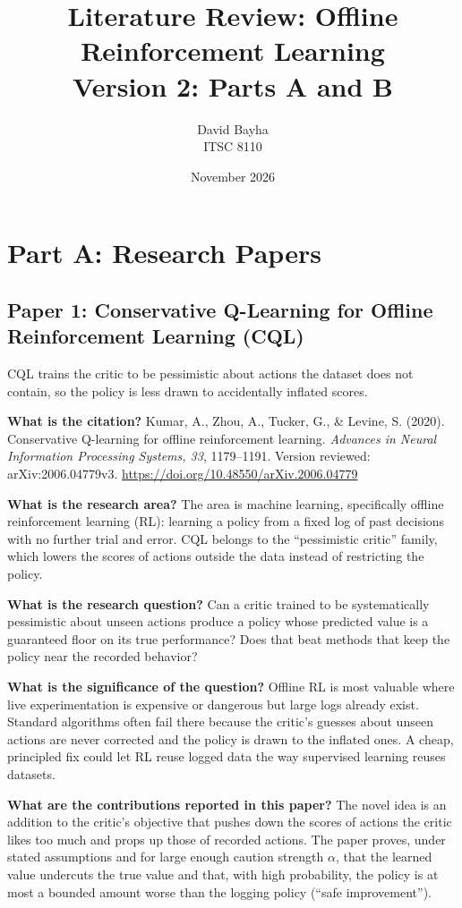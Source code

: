 \documentclass[11pt]{article}
\title{Literature Review: Offline Reinforcement Learning\\Version 2: Parts A and B}
\author{David Bayha\\ITSC 8110}
\date{November 2026}
\newcommand{\paper}[1]{\subsection*{#1}}
\newcommand{\q}[2]{\item \textbf{#1} #2}
\begin{document}
\maketitle



\section*{Part A: Research Papers}



\paper{Paper 1: Conservative Q-Learning for Offline Reinforcement Learning (CQL)}
CQL trains the critic to be pessimistic about actions the dataset does not contain, so the policy is less drawn to accidentally inflated scores.
\begin{qna}

\q{What is the citation?}
Kumar, A., Zhou, A., Tucker, G., \& Levine, S. (2020). Conservative Q-learning for offline reinforcement learning. \emph{Advances in Neural Information Processing Systems, 33}, 1179--1191. Version reviewed: arXiv:2006.04779v3. \url{https://doi.org/10.48550/arXiv.2006.04779}

\q{What is the research area?}
The area is machine learning, specifically offline reinforcement learning (RL): learning a policy from a fixed log of past decisions with no further trial and error. CQL belongs to the ``pessimistic critic'' family, which lowers the scores of actions outside the data instead of restricting the policy.

\q{What is the research question?}
Can a critic trained to be systematically pessimistic about unseen actions produce a policy whose predicted value is a guaranteed floor on its true performance? Does that beat methods that keep the policy near the recorded behavior?

\q{What is the significance of the question?}
Offline RL is most valuable where live experimentation is expensive or dangerous but large logs already exist. Standard algorithms often fail there because the critic's guesses about unseen actions are never corrected and the policy is drawn to the inflated ones. A cheap, principled fix could let RL reuse logged data the way supervised learning reuses datasets.

\q{What are the contributions reported in this paper?}
The novel idea is an addition to the critic's objective that pushes down the scores of actions the critic likes too much and props up those of recorded actions. The paper proves, under stated assumptions and for large enough caution strength $\alpha$, that the learned value undercuts the true value and that, with high probability, the policy is at most a bounded amount worse than the logging policy (``safe improvement'').


\end{qna}
\end{document}
